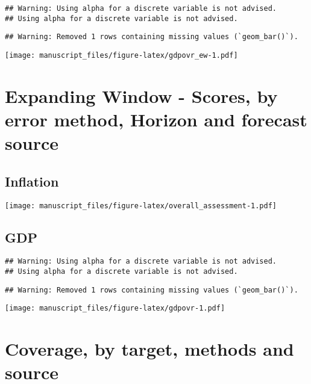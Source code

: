 \documentclass[
]{article}
\begin{document}
\begin{verbatim}
## Warning: Using alpha for a discrete variable is not advised.
## Using alpha for a discrete variable is not advised.
\end{verbatim}

\begin{verbatim}
## Warning: Removed 1 rows containing missing values (`geom_bar()`).
\end{verbatim}

\texttt{[image: manuscript\_files/figure-latex/gdpovr\_ew-1.pdf]}

\hypertarget{expanding-window---scores-by-error-method-horizon-and-forecast-source}{%
\section{Expanding Window - Scores, by error method, Horizon and forecast source}\label{expanding-window---scores-by-error-method-horizon-and-forecast-source}}

\hypertarget{inflation-1}{%
\subsection{Inflation}\label{inflation-1}}

\texttt{[image: manuscript\_files/figure-latex/overall\_assessment-1.pdf]}
\newpage

\hypertarget{gdp-1}{%
\subsection{GDP}\label{gdp-1}}

\begin{verbatim}
## Warning: Using alpha for a discrete variable is not advised.
## Using alpha for a discrete variable is not advised.
\end{verbatim}

\begin{verbatim}
## Warning: Removed 1 rows containing missing values (`geom_bar()`).
\end{verbatim}

\texttt{[image: manuscript\_files/figure-latex/gdpovr-1.pdf]}

\hypertarget{coverage-by-target-methods-and-source}{%
\section{Coverage, by target, methods and source}\label{coverage-by-target-methods-and-source}}
\end{document}
